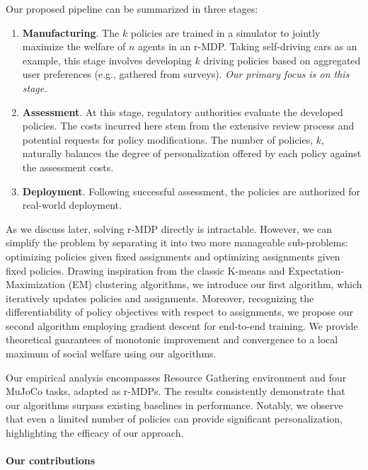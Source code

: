 \documentclass[letterpaper]{article} %
\begin{document}
Our proposed pipeline can be summarized in three stages:

\begin{enumerate}
    \item \textbf{Manufacturing}. The $k$ policies are trained in a simulator to jointly maximize the welfare of $n$ agents in an r-MDP. Taking self-driving cars as an example, this stage involves developing $k$ driving policies based on aggregated user preferences (e.g., gathered from surveys). \textit{Our primary focus is on this stage.}
    
    \item \textbf{Assessment}. At this stage, regulatory authorities evaluate the developed policies. The costs incurred here stem from the extensive review process and potential requests for policy modifications. The number of policies, $k$, naturally balances the degree of personalization offered by each policy against the assessment costs.
    
    \item \textbf{Deployment}.  Following successful assessment, the policies are authorized for real-world deployment.
\end{enumerate}


As we discuss later, solving r-MDP directly is intractable. However, we can simplify the problem by separating it into two more manageable sub-problems: optimizing policies given fixed assignments and optimizing assignments given fixed policies. Drawing inspiration from the classic K-means \cite{macqueen1967classification,lloyd1982least} and Expectation-Maximization (EM) \cite{dempster1977maximum}  clustering algorithms, we introduce our first algorithm, which iteratively updates policies and assignments. Moreover, recognizing the differentiability of policy objectives with respect to assignments, we propose our second algorithm employing gradient descent for end-to-end training. We provide theoretical guarantees of monotonic improvement and convergence to a local maximum of social welfare using our algorithms.

Our empirical analysis encompasses Resource Gathering environment \cite{barrett2008learning} and four MuJoCo \cite{todorov2012mujoco} tasks, adapted as r-MDPs. The results consistently demonstrate that our algorithms surpass existing baselines in performance. Notably, we observe that even a limited number of policies can provide significant personalization, highlighting the efficacy of our approach.

\paragraph{Our contributions}
\end{document}
